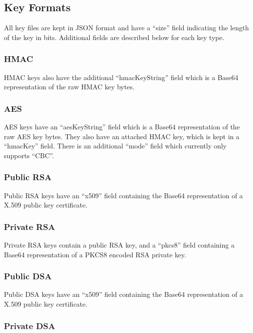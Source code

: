 \documentclass{llncs}
\begin{document}
\subsection{Key Formats}\label{formats}

All key files are kept in JSON format and have a ``size'' field indicating the
length of the key in bits. Additional fields are described below for each key
type.

\subsubsection{HMAC}

HMAC keys also have the additional ``hmacKeyString'' field which is a Base64
representation of the raw HMAC key bytes.

\subsubsection{AES}

AES keys have an ``aesKeyString'' field which is a Base64 representation of the
raw AES key bytes. They also have an attached HMAC key, which is kept in a
``hmacKey'' field. There is an additional ``mode'' field which currently only
supports ``CBC''.

\subsubsection{Public RSA}

Public RSA keys have an ``x509'' field containing the Base64 representation of
a X.509 public key certificate. 

\subsubsection{Private RSA}

Private RSA keys contain a public RSA key, and a ``pkcs8'' field containing a
Base64 representation of a PKCS8 encoded RSA private key. 

\subsubsection{Public DSA}

Public DSA keys have an ``x509'' field containing the Base64 representation of
a X.509 public key certificate. 

\subsubsection{Private DSA}
\end{document}
